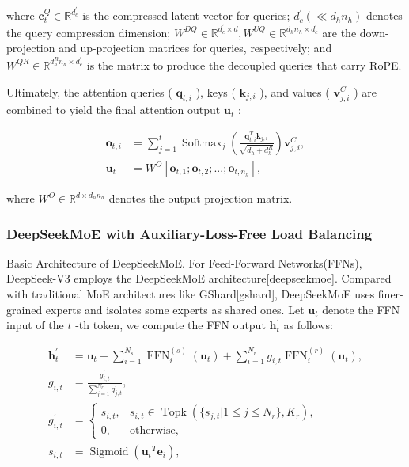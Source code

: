 \documentclass[11pt,a4paper]{article}
\begin{document}
where  $\mathbf{c}_{t}^{Q} \in \mathbb{R}^{d_c^{\prime}}$  is the compressed latent vector for queries;  $d_c^{\prime} (\ll d_h n_h)$  denotes the query compression dimension;  $W^{DQ} \in \mathbb{R}^{d_c^{\prime} \times d}, W^{UQ} \in \mathbb{R}^{d_h n_h \times d_c^{\prime}}$  are the down-projection and up-projection matrices for queries, respectively; and  $W^{QR} \in \mathbb{R}^{d_h^R n_h \times d_c^{\prime}}$  is the matrix to produce the decoupled queries that carry RoPE.

Ultimately, the attention queries ( $\mathbf{q}_{t, i}$ ), keys ( $\mathbf{k}_{j, i}$ ), and values ( $\mathbf{v}_{j, i}^{C}$ ) are combined to yield the final attention output  $\mathbf{u}_{t}$ :

$$\begin{align}
    \mathbf{o}_{t, i} &= \sum_{j=1}^{t} \operatorname{Softmax}_j(\frac{\mathbf{q}_{t, i}^T \mathbf{k}_{j, i}}{\sqrt{d_{h} + d_{h}^{R}}}) \mathbf{v}_{j, i}^{C}, \\
    \mathbf{u}_{t} &= W^{O} [\mathbf{o}_{t, 1};\mathbf{o}_{t, 2};...;\mathbf{o}_{t, n_{h}}],
\end{align}$$

where  $W^{O} \in \mathbb{R}^{d \times d_h n_h}$  denotes the output projection matrix.

\subsubsection{DeepSeekMoE with Auxiliary-Loss-Free Load Balancing}

Basic Architecture of DeepSeekMoE. For Feed-Forward Networks(FFNs), DeepSeek-V3 employs the DeepSeekMoE architecture[deepseekmoe]. Compared with traditional MoE architectures like GShard[gshard], DeepSeekMoE uses finer-grained experts and isolates some experts as shared ones. Let  $\mathbf{u}_{t}$  denote the FFN input of the  $t$ -th token, we compute the FFN output  $\mathbf{h}_{t}^{\prime}$  as follows:

$$\begin{align}
    \mathbf{h}_{t}^{\prime} & = \mathbf{u}_{t} + \sum_{i=1}^{N_{s}} {\operatorname{FFN}^{(s)}_{i}\left( \mathbf{u}_{t} \right)} + \sum_{i=1}^{N_r} {g_{i,t} \operatorname{FFN}^{(r)}_{i}\left( \mathbf{u}_{t} \right)}, \\
    g_{i,t} & = \frac{g^{\prime}_{i,t}}{\sum_{j=1}^{N_r} g^{\prime}_{j,t}}, \\
    g^{\prime}_{i,t} & = \begin{cases} 
    s_{i,t}, & s_{i,t} \in \operatorname{Topk} (\{ s_{j, t} | 1 \leq j \leq N_r \}, K_{r}), \\
    0, & \text{otherwise}, 
    \end{cases} \\
    s_{i,t} & = \operatorname{Sigmoid} \left( {\mathbf{u}_{t}}^{T} \mathbf{e}_{i} \right),
\end{align}$$
\end{document}
